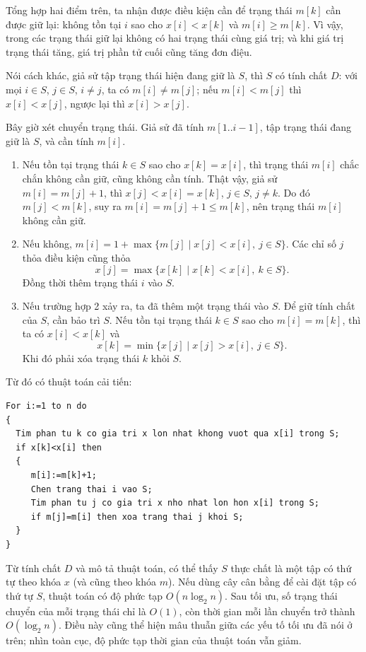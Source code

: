 \documentclass[11pt]{article}
\begin{document}
Tổng hợp hai điểm trên, ta nhận được điều kiện cần để trạng thái \(m[k]\) cần
được giữ lại: không tồn tại \(i\) sao cho \(x[i]<x[k]\) và \(m[i]\ge m[k]\).
Vì vậy, trong các trạng thái giữ lại không có hai trạng thái cùng giá trị; và
khi giá trị trạng thái tăng, giá trị phần tử cuối cũng tăng đơn điệu.

Nói cách khác, giả sử tập trạng thái hiện đang giữ là \(S\), thì \(S\) có
tính chất \(D\): với mọi \(i\in S\), \(j\in S\), \(i\ne j\), ta có
\(m[i]\ne m[j]\); nếu \(m[i]<m[j]\) thì \(x[i]<x[j]\), ngược lại thì
\(x[i]>x[j]\).

Bây giờ xét chuyển trạng thái. Giả sử đã tính \(m[1..i-1]\), tập trạng thái
đang giữ là \(S\), và cần tính \(m[i]\).
\begin{enumerate}
  \item Nếu tồn tại trạng thái \(k\in S\) sao cho \(x[k]=x[i]\), thì trạng
  thái \(m[i]\) chắc chắn không cần giữ, cũng không cần tính. Thật vậy, giả sử
  \(m[i]=m[j]+1\), thì \(x[j]<x[i]=x[k]\), \(j\in S\), \(j\ne k\). Do đó
  \(m[j]<m[k]\), suy ra \(m[i]=m[j]+1\le m[k]\), nên trạng thái \(m[i]\)
  không cần giữ.
  \item Nếu không, \(m[i]=1+\max\{m[j]\mid x[j]<x[i],\ j\in S\}\). Các chỉ số
  \(j\) thỏa điều kiện cũng thỏa
  \[
    x[j]=\max\{x[k]\mid x[k]<x[i],\ k\in S\}.
  \]
  Đồng thời thêm trạng thái \(i\) vào \(S\).
  \item Nếu trường hợp 2 xảy ra, ta đã thêm một trạng thái vào \(S\). Để giữ
  tính chất của \(S\), cần bảo trì \(S\). Nếu tồn tại trạng thái \(k\in S\)
  sao cho \(m[i]=m[k]\), thì ta có \(x[i]<x[k]\) và
  \[
    x[k]=\min\{x[j]\mid x[j]>x[i],\ j\in S\}.
  \]
  Khi đó phải xóa trạng thái \(k\) khỏi \(S\).
\end{enumerate}

Từ đó có thuật toán cải tiến:
\begin{verbatim}
For i:=1 to n do
{
  Tim phan tu k co gia tri x lon nhat khong vuot qua x[i] trong S;
  if x[k]<x[i] then
  {
     m[i]:=m[k]+1;
     Chen trang thai i vao S;
     Tim phan tu j co gia tri x nho nhat lon hon x[i] trong S;
     if m[j]=m[i] then xoa trang thai j khoi S;
  }
}
\end{verbatim}

Từ tính chất \(D\) và mô tả thuật toán, có thể thấy \(S\) thực chất là một tập
có thứ tự theo khóa \(x\) (và cũng theo khóa \(m\)). Nếu dùng cây cân bằng để
cài đặt tập có thứ tự \(S\), thuật toán có độ phức tạp \(O(n\log_2 n)\). Sau
tối ưu, số trạng thái chuyển của mỗi trạng thái chỉ là \(O(1)\), còn thời
gian mỗi lần chuyển trở thành \(O(\log_2 n)\). Điều này cũng thể hiện mâu
thuẫn giữa các yếu tố tối ưu đã nói ở trên; nhìn toàn cục, độ phức tạp thời
gian của thuật toán vẫn giảm.
\end{document}
